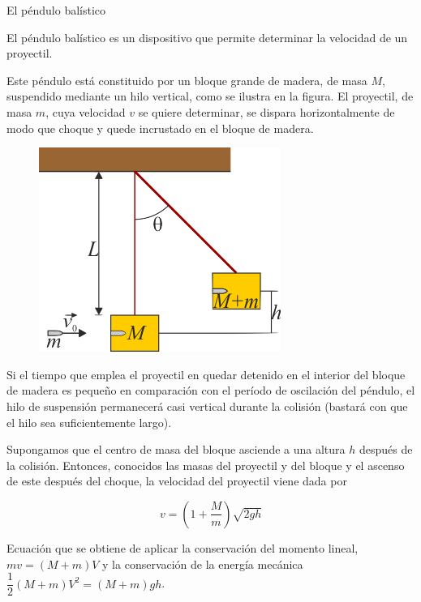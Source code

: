\newpage %
\begin{myblock}{El péndulo balístico}

El péndulo balístico es un dispositivo que permite determinar la velocidad de un proyectil.

\begin{multicols}{2}
\vspace{2mm} Este péndulo está constituido por un bloque grande de madera, de masa $M$, suspendido mediante un hilo vertical, como se ilustra en la figura. El proyectil, de masa $m$, cuya velocidad $v$ se quiere determinar, se dispara horizontalmente de modo que choque y quede incrustado en el bloque de madera.
\begin{figure}[H]
	\centering
	\includegraphics[width=.5\textwidth]{imagenes/imagenes17/T17IM07.png}
	\end{figure}
\end{multicols}
\vspace{2mm} Si el tiempo que emplea el proyectil en quedar detenido en el interior del bloque de madera es pequeño en comparación con el período de oscilación del péndulo, el hilo de suspensión permanecerá casi vertical durante la colisión (bastará con que el hilo sea suficientemente largo). 

\vspace{2mm} Supongamos que el centro de masa del bloque asciende a una altura $h$ después de la colisión. Entonces, conocidos las masas del proyectil y del bloque y el ascenso de este después del choque, la velocidad del proyectil viene dada por 

$$v=\left( 1 + \dfrac M m \right) \sqrt{2gh}$$

\vspace{2mm} Ecuación que se obtiene de aplicar la conservación del momento lineal, $mv=(M+m)V$ y la conservación de la energía mecánica $\dfrac 1 2 (M+m) V^2=(M+m)gh$.
\end{myblock}


